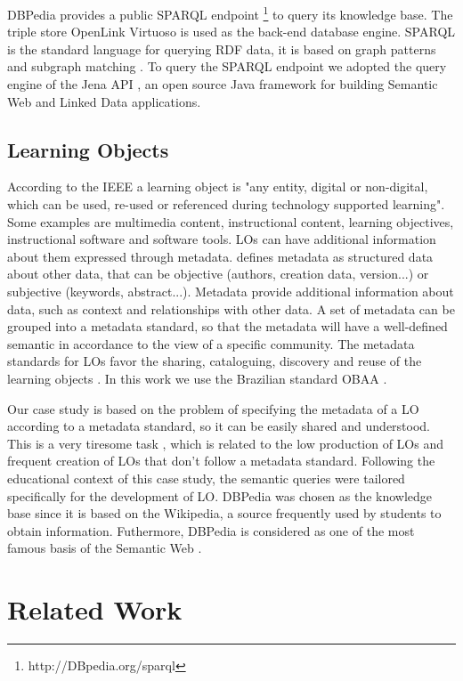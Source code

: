 \documentclass[a4paper,twoside]{article}
\begin{document}
DBPedia provides a public SPARQL endpoint \footnote{http://DBpedia.org/sparql} to query its knowledge base. The triple store OpenLink Virtuoso \cite{refVIRT} is used as the back-end database engine. SPARQL is the standard language for querying RDF data, it is based on graph patterns and subgraph matching \cite{refABC,refDEF}. To query the SPARQL endpoint we adopted the query engine of the Jena API \cite{refJENA}, an open source Java framework for building Semantic Web and Linked Data applications.


\subsection{Learning Objects}

\noindent According to the IEEE \cite{ref40} a learning object is "any entity, digital or non-digital, which can be used, re-used or referenced during technology supported learning". Some examples are multimedia content, instructional content, learning objectives, instructional software and software tools. LOs can have additional information about them expressed through metadata.
\cite{ref42} defines metadata as structured data about other data, that can be objective (authors, creation data, version...) or subjective (keywords, abstract...). Metadata provide additional information about data, such as context and relationships with other data. A set of metadata can be grouped into a metadata standard, so that the metadata will have a well-defined semantic in accordance to the view of a specific community. The metadata standards for LOs favor the sharing, cataloguing, discovery and reuse of the learning objects \cite{ref42}. In this work we use the Brazilian standard OBAA \cite{refOBAA}.

Our case study is based on the problem of specifying the metadata of a LO according to a metadata standard, so it can be easily shared and understood. This is a very tiresome task \cite{ref38}, which is related to the low production of LOs and frequent creation of LOs that don't follow a metadata standard. Following the educational context of this case study, the semantic queries were tailored specifically for the development of LO. DBPedia was chosen as the knowledge base since it is based on the Wikipedia, a source frequently used by students to obtain information. Futhermore, DBPedia is considered as one of the most famous basis of the Semantic Web \cite{refEntrevista}.

\section{Related Work}
\end{document}
